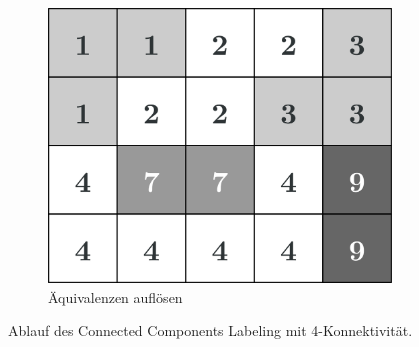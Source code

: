 \begin{figure}[H]
  \begin{subfigure}[t]{0.327\columnwidth}
    \centering
    \includegraphics[width=\columnwidth]{img/basics/connected-compontents/labeling-3}
    \caption{Äquivalenzen auflösen}
  \end{subfigure}
  \caption[Ablauf Connected Components Labeling]{Ablauf des Connected Components Labeling mit 4-Konnektivität.}
\end{figure}
